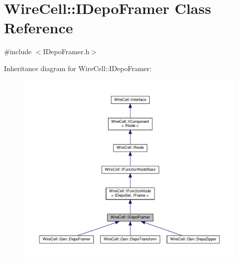 \hypertarget{class_wire_cell_1_1_i_depo_framer}{}\section{Wire\+Cell\+:\+:I\+Depo\+Framer Class Reference}
\label{class_wire_cell_1_1_i_depo_framer}


{\ttfamily \#include $<$I\+Depo\+Framer.\+h$>$}



Inheritance diagram for Wire\+Cell\+:\+:I\+Depo\+Framer\+:
\nopagebreak
\begin{figure}[H]
\begin{center}
\leavevmode
\includegraphics[width=350pt]{class_wire_cell_1_1_i_depo_framer__inherit__graph}
\end{center}
\end{figure}


